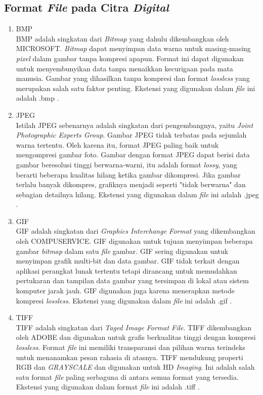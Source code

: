 	\subsection{Format \emph{File} pada Citra \emph{Digital}}
		\begin{enumerate}
			\item BMP\\
			BMP adalah singkatan dari \emph{Bitmap} yang dahulu dikembangkan oleh MICROSOFT. \emph{Bitmap} dapat menyimpan data warna untuk masing-masing \emph{pixel} dalam gambar tanpa kompresi apapun. Format ini dapat digunakan untuk menyembunyikan data tanpa menaikkan kecurigaan pada mata manusia. Gambar yang dihasilkan tanpa kompresi dan format \emph{lossless} yang merupakan salah satu faktor penting. Ekstensi yang digunakan dalam \emph{file} ini adalah .bmp \cite{gautam}.
			\item JPEG\\
			Istilah JPEG sebenarnya adalah singkatan dari pengembangnya, yaitu \emph{Joint Photographic Experts Group}. Gambar JPEG tidak terbatas pada sejumlah warna tertentu. Oleh karena itu, format JPEG paling baik untuk mengompresi gambar foto. Gambar dengan format JPEG dapat berisi data gambar beresolusi tinggi berwarna-warni, itu adalah format \emph{lossy}, yang berarti beberapa kualitas hilang ketika gambar dikompresi. Jika gambar terlalu banyak dikompres, grafiknya menjadi seperti "tidak berwarna" dan sebagian detailnya hilang. Ekstensi yang digunakan dalam \emph{file} ini adalah .jpeg \cite{elgabar}.
			\item GIF\\
			GIF adalah singkatan dari \emph{Graphics Interchange Format} yang dikembangkan oleh COMPUSERVICE. GIF digunakan untuk tujuan menyimpan beberapa gambar \emph{bitmap} dalam satu \emph{file} gambar. GIF sering digunakan untuk menyimpan grafik multi-bit dan data gambar. GIF tidak terkait dengan aplikasi perangkat lunak tertentu tetapi dirancang untuk memudahkan pertukaran dan tampilan data gambar yang tersimpan di lokal atau sistem komputer jarak jauh. GIF digunakan juga karena menerapkan metode kompresi \emph{lossless}. Ekstensi yang digunakan dalam \emph{file} ini adalah .gif \cite{elgabar2}.
			\item TIFF\\
			TIFF adalah singkatan dari \emph{Taged Image Format File}. TIFF dikembangkan oleh ADOBE dan digunakan untuk grafis berkualitas tinggi dengan kompresi \emph{lossless}. Format \emph{file} ini memiliki transparansi dan pilihan warna terindeks untuk menanamkan pesan rahasia di atasnya. TIFF mendukung properti RGB dan \emph{GRAYSCALE} dan digunakan untuk HD \emph{Imaging}. Ini adalah salah satu format \emph{file} paling serbaguna di antara semua format yang tersedia. Ekstensi yang digunakan dalam format \emph{file} ini adalah .tiff \cite{gautam}.

\end{enumerate}
